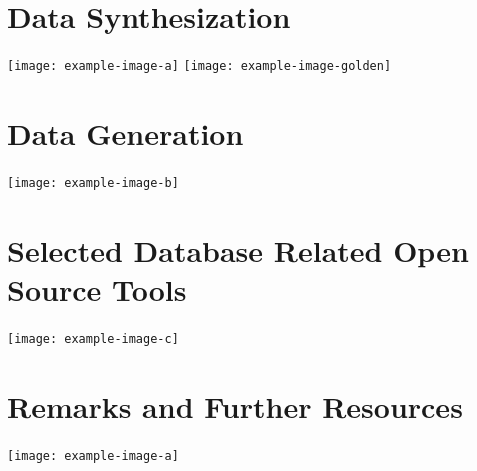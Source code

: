 \section{Data Synthesization}
\lipsum[6-8]
\noindent\texttt{[image: example-image-a]}\qquad
\texttt{[image: example-image-golden]}\qquad
\section{Data Generation}
\lipsum[8-9]
\noindent\texttt{[image: example-image-b]} 
\section{Selected Database Related Open Source Tools }
\lipsum[8-9]
\noindent\texttt{[image: example-image-c]} 
\section{Remarks and Further Resources}
\lipsum[8-9]
\noindent\texttt{[image: example-image-a]} 
